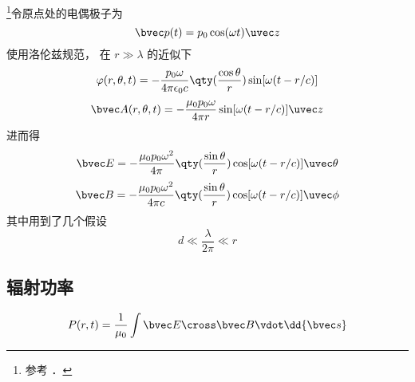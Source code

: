 
\begin{issues}
\issueDraft
\end{issues}


\footnote{参考 \cite{GriffE}．}令原点处的电偶极子为
\begin{equation}
\bvec p(t) = p_0 \cos(\omega t) \uvec z
\end{equation}
使用洛伦兹规范， 在 $r \gg \lambda$ 的近似下
\begin{equation}
\varphi(r, \theta, t) = -\frac{p_0\omega}{4\pi\epsilon_0 c} \qty(\frac{\cos\theta}{r}) \sin[\omega(t - r/c)]
\end{equation}
\begin{equation}
\bvec A(r, \theta, t) = -\frac{\mu_0 p_0 \omega}{4\pi r} \sin[\omega(t - r/c)]\uvec z
\end{equation}
进而得
\begin{equation}
\bvec E = -\frac{\mu_0 p_0\omega^2}{4\pi} \qty(\frac{\sin\theta}{r})\cos[\omega(t - r/c)]\uvec \theta
\end{equation}
\begin{equation}
\bvec B = -\frac{\mu_0 p_0\omega^2}{4\pi c} \qty(\frac{\sin\theta}{r})\cos[\omega(t - r/c)]\uvec \phi
\end{equation}
其中用到了几个假设
\begin{equation}
d \ll \frac{\lambda}{2\pi} \ll r
\end{equation}


\subsection{辐射功率}
\begin{equation}
P(r, t) = \frac{1}{\mu_0} \int \bvec E \cross \bvec B \vdot \dd{\bvec s}
\end{equation}
